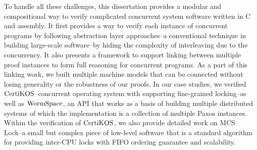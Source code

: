 To handle all these challenges, this dissertation provides a modular and compositional way to verify complicated concurrent system software
 written in C and assembly. 
 It first provides a way to verify each instance of concurrent programs by following abstraction layer approaches--a conventional technique in building large-scale software--by hiding the complexity of interleaving due to the concurrency.
  It also presents a framework to support linking between multiple proof instances to form full reasoning for 
  concurrent programs. As a part of this linking work, we built multiple machine models that can be connected without losing generality or 
  the robustness of our proofs. In our case studies, we verified $\mathrm{CertiKOS}$--concurrent operating system with supporting fine-grained 
  locking--as well as $\mathrm{WormSpace}$, an API that works as a basis of building multiple distributed systems of which the implementation is 
  a collection of multiple Paxos instances. Within the verification of $\mathrm{CertiKOS}$, we also provide detailed work on MCS Lock--a small but complex piece of low-level software that is a standard algorithm for providing inter-CPU locks with FIFO ordering guarantee and scalability.



%
%

